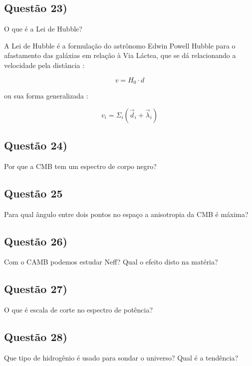 \documentclass{article}
\begin{document}
\subsection*{Questão 23)}
\begin{boxx}
O que é a Lei de Hubble?
\end{boxx}

 A Lei de Hubble é a formulação do astrônomo Edwin Powell Hubble para o afastamento das galáxias em relação à Via Láctea, que se dá  relacionando a velocidade pela distância :
 
 $$ v = H_0 \cdot d $$
 
 ou sua forma generalizada : 
 
 $$ v_i = \Sigma_i (\Vec{d}{_i} + \Vec{\lambda}_i) $$


\subsection*{Questão 24)}
\begin{boxx}
Por que a CMB tem um espectro de corpo negro?
\end{boxx}

\subsection*{Questão 25}
\begin{boxx}
Para qual ângulo entre dois pontos no espaço a anisotropia da CMB é máxima?
\end{boxx}

\subsection*{Questão 26)}
\begin{boxx}
Com o CAMB podemos estudar Neff? Qual o efeito disto na matéria?
\end{boxx}

\subsection*{Questão 27)}
\begin{boxx}
O que é escala de corte no espectro de potência?
\end{boxx}

\subsection*{Questão 28)}
\begin{boxx}
Que tipo de hidrogênio é usado para sondar o universo? Qual é a tendência?
\end{boxx}
\end{document}
